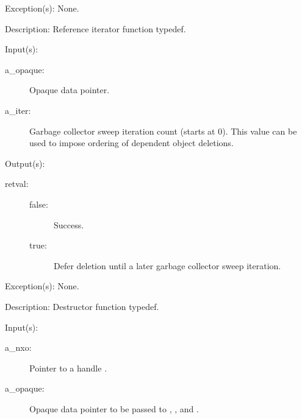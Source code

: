 \begin{capi}
\begin{capilist}
	\item[Exception(s): ] None.
	\item[Description: ]
		Reference iterator function typedef.
	\end{capilist}
\label{cw_nxo_handle_delete_t}
	\begin{capilist}
	\item[Input(s): ]
		\begin{description}\item[]
		\item[a\_opaque: ]
			Opaque data pointer.
		\item[a\_iter: ]
			Garbage collector sweep iteration count (starts at 0).
			This value can be used to impose ordering of dependent
			object deletions.
		\end{description}
	\item[Output(s): ]
		\begin{description}\item[]
		\item[retval: ]
			\begin{description}\item[]
			\item[false: ] Success.
			\item[true: ] Defer deletion until a later garbage
			collector sweep iteration.
			\end{description}
		\end{description}
	\item[Exception(s): ] None.
	\item[Description: ]
		Destructor function typedef.
	\end{capilist}
\label{nxo_handle_new}
	\begin{capilist}
	\item[Input(s): ]
		\begin{description}\item[]
		\item[a\_nxo: ]
			Pointer to a handle .
		\item[a\_opaque: ]
			Opaque data pointer to be passed to ,
			, and .

\end{description}
\end{capilist}
\end{capi}
